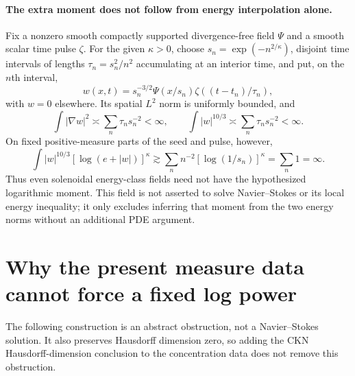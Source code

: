 \documentclass[11pt]{article}
\begin{document}
\paragraph{The extra moment does not follow from energy interpolation alone.}
Fix a nonzero smooth compactly supported divergence-free field $\Psi$ and a smooth scalar time pulse $\zeta$. For the given $\kappa>0$, choose $s_n=\exp(-n^{2/\kappa})$, disjoint time intervals of lengths $\tau_n=s_n^2/n^2$ accumulating at an interior time, and put, on the $n$th interval,
$$
w(x,t)=s_n^{-3/2}\Psi(x/s_n)
\zeta((t-t_n)/\tau_n),
$$
with $w=0$ elsewhere. Its spatial $L^2$ norm is uniformly bounded, and
$$
\int|\nabla w|^2\asymp\sum_n\tau_ns_n^{-2}<\infty,
\qquad
\int|w|^{10/3}\asymp\sum_n\tau_ns_n^{-2}<\infty.
$$
On fixed positive-measure parts of the seed and pulse, however,
$$
\int|w|^{10/3}[\log(e+|w|)]^\kappa
\gtrsim\sum_n n^{-2}[\log(1/s_n)]^\kappa
=\sum_n1=\infty.
$$
Thus even solenoidal energy-class fields need not have the hypothesized logarithmic moment. This field is not asserted to solve Navier--Stokes or its local energy inequality; it only excludes inferring that moment from the two energy norms without an additional PDE argument.

\section{Why the present measure data cannot force a fixed log power}
The following construction is an abstract obstruction, not a Navier--Stokes solution. It also preserves Hausdorff dimension zero, so adding the CKN Hausdorff-dimension conclusion to the concentration data does not remove this obstruction.
\end{document}
